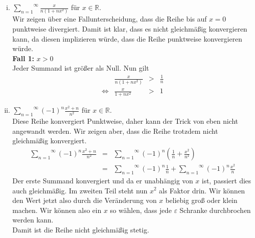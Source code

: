 \documentclass[11pt,a4paper,ngerman]{article}
\begin{document}
\begin{enumerate}[(i)]
    \item $\overset{\infty}{\underset{n=1}{\sum}} \frac{x}{n(1+nx^2)}$ für $x\in\mathbb{R}$.\\
        Wir zeigen über eine Fallunterscheidung, dass die Reihe bis auf $x=0$ punktweise
        divergiert. Damit ist klar, dass es nicht gleichmäßig konvergieren kann, da 
        diesen implizieren würde, dass die Reihe punktweise konvergieren würde.\\
        \textbf{Fall 1:} $x>0$\\
        Jeder Summand ist größer als Null. Nun gilt
        $$\begin{array}{crcl}
            & \frac{x}{n(1+nx^2)} &>& \frac{1}{n}\\
            \Leftrightarrow & \frac{x}{1+nx^2} &>& 1
        \end{array}$$
    \item $\overset{\infty}{\underset{n=1}{\sum}} (-1)^n \frac{x^2+n}{n^2}$ für $x\in\mathbb{R}$.\\
        Diese Reihe konvergiert Punktweise, daher kann der Trick von eben nicht angewandt werden.
        Wir zeigen aber, dass die Reihe trotzdem nicht gleichmäßig konvergiert.\\
        $$\begin{array}{rcl}
            \overset{\infty}{\underset{n=1}{\sum}} (-1)^n \frac{x^2 + n}{n^2}
                &=& \overset{\infty}{\underset{n=1}{\sum}} (-1)^n \left( \frac{1}{n} + \frac{x^2}{n^2} \right)\\
                &=& \overset{\infty}{\underset{n=1}{\sum}} (-1)^n \frac{1}{n} +
                    \overset{\infty}{\underset{n=1}{\sum}} (-1)^n \frac{x^2}{n}
        \end{array}$$
        Der erste Summand konvergiert und da er unabhängig von $x$ ist, passiert dies auch
        gleichmäßig. Im zweiten Teil steht nun $x^2$ als Faktor drin. Wir können den
        Wert jetzt also durch die Veränderung von $x$ beliebig groß oder klein machen.
        Wir können also ein $x$ so wählen, dass jede $\varepsilon$ Schranke durchbrochen werden
        kann.\\
        Damit ist die Reihe nicht gleichmäßig stetig.
\end{enumerate}

\label{LastPage}
\end{document}
